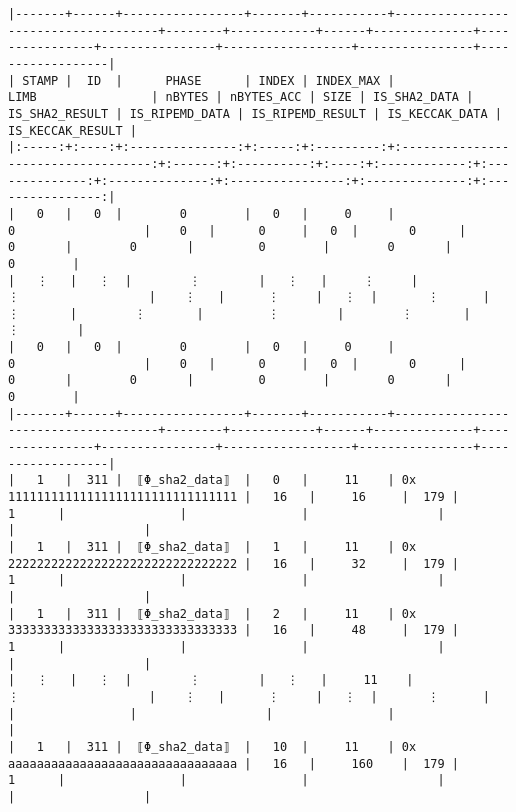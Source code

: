 \documentclass[varwidth=\maxdimen,margin=0.5cm,multi={verbatim}]{standalone}
\begin{document}
\begin{verbatim}
|-------+------+-----------------+-------+-----------+-------------------------------------+--------+------------+------+--------------+----------------+----------------+------------------+----------------+------------------|
| STAMP |  ID  |      PHASE      | INDEX | INDEX_MAX |                 LIMB                | nBYTES | nBYTES_ACC | SIZE | IS_SHA2_DATA | IS_SHA2_RESULT | IS_RIPEMD_DATA | IS_RIPEMD_RESULT | IS_KECCAK_DATA | IS_KECCAK_RESULT |
|:-----:+:----:+:---------------:+:-----:+:---------:+:-----------------------------------:+:------:+:----------:+:----:+:------------:+:--------------:+:--------------:+:----------------:+:--------------:+:----------------:|
|   0   |   0  |        0        |   0   |     0     |                  0                  |    0   |      0     |   0  |       0      |        0       |        0       |         0        |        0       |         0        |
|   ⋮   |   ⋮  |        ⋮        |   ⋮   |     ⋮     |                  ⋮                  |    ⋮   |      ⋮     |   ⋮  |       ⋮      |        ⋮       |        ⋮       |         ⋮        |        ⋮       |         ⋮        |
|   0   |   0  |        0        |   0   |     0     |                  0                  |    0   |      0     |   0  |       0      |        0       |        0       |         0        |        0       |         0        |
|-------+------+-----------------+-------+-----------+-------------------------------------+--------+------------+------+--------------+----------------+----------------+------------------+----------------+------------------|
|   1   |  311 |  ⟦Φ_sha2_data⟧  |   0   |     11    | 0x 11111111111111111111111111111111 |   16   |     16     |  179 |       1      |                |                |                  |                |                  |
|   1   |  311 |  ⟦Φ_sha2_data⟧  |   1   |     11    | 0x 22222222222222222222222222222222 |   16   |     32     |  179 |       1      |                |                |                  |                |                  |
|   1   |  311 |  ⟦Φ_sha2_data⟧  |   2   |     11    | 0x 33333333333333333333333333333333 |   16   |     48     |  179 |       1      |                |                |                  |                |                  |
|   ⋮   |   ⋮  |        ⋮        |   ⋮   |     11    |                  ⋮                  |    ⋮   |      ⋮     |   ⋮  |       ⋮      |                |                |                  |                |                  |
|   1   |  311 |  ⟦Φ_sha2_data⟧  |   10  |     11    | 0x aaaaaaaaaaaaaaaaaaaaaaaaaaaaaaaa |   16   |     160    |  179 |       1      |                |                |                  |                |                  |

\end{verbatim}
\end{document}
